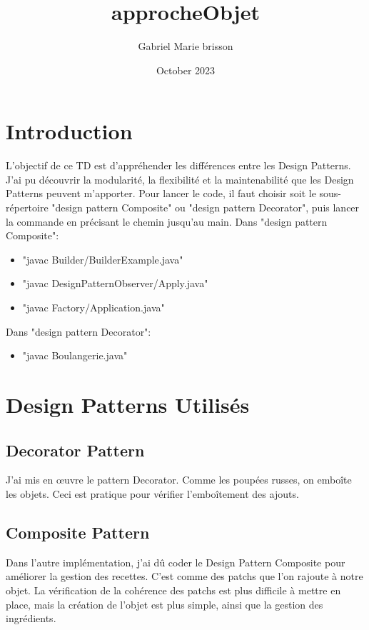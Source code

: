 \documentclass{article}
\title{approcheObjet}
\author{Gabriel Marie brisson}
\date{October 2023}
\begin{document}
\maketitle

\section{Introduction}

L'objectif de ce TD est d'appréhender les différences entre les Design Patterns. J'ai pu découvrir la modularité, la flexibilité et la maintenabilité que les Design Patterns peuvent m'apporter. Pour lancer le code, il faut choisir soit le sous-répertoire "design pattern Composite" ou "design pattern Decorator", puis lancer la commande en précisant le chemin jusqu'au main. Dans "design pattern Composite":
\begin{itemize}
\item "javac Builder/BuilderExample.java"
\item "javac DesignPatternObserver/Apply.java"
\item "javac Factory/Application.java"
\end{itemize}

Dans "design pattern Decorator":
\begin{itemize}
\item "javac Boulangerie.java"
\end{itemize}

\section{Design Patterns Utilisés}

\subsection{Decorator Pattern}


J'ai mis en œuvre le pattern Decorator. Comme les poupées russes, on emboîte les objets. Ceci est pratique pour vérifier l'emboîtement des ajouts.

\subsection{Composite Pattern}

Dans l'autre implémentation, j'ai dû coder le Design Pattern Composite pour améliorer la gestion des recettes. C'est comme des patchs que l'on rajoute à notre objet. La vérification de la cohérence des patchs est plus difficile à mettre en place, mais la création de l'objet est plus simple, ainsi que la gestion des ingrédients.
\end{document}
